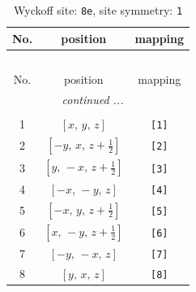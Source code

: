\documentclass[fleqn,8pt]{jsarticle}
\begin{document}
\renewcommand{\arraystretch}{1.2}
\begin{longtable}{ccc}
\caption{Wyckoff site: {\tt 8e}, site symmetry: {\tt 1}}
 \\
 \hline \hline
No. & position & mapping \\ \hline \endfirsthead

\multicolumn{2}{l}{\tablename\ \thetable{}} \\
 \hline \hline
No. & position & mapping \\ \hline \endhead

 \hline \hline
\multicolumn{2}{r}{\footnotesize\it continued ...} \\ \endfoot

 \hline \hline
\multicolumn{2}{r}{} \\ \endlastfoot

1 & $\left[ x,\, y,\, z \right]$ & {\tt [1]} \\ \hline
2 & $\left[ - y,\, x,\, z + \frac{1}{2} \right]$ & {\tt [2]} \\ \hline
3 & $\left[ y,\, - x,\, z + \frac{1}{2} \right]$ & {\tt [3]} \\ \hline
4 & $\left[ - x,\, - y,\, z \right]$ & {\tt [4]} \\ \hline
5 & $\left[ - x,\, y,\, z + \frac{1}{2} \right]$ & {\tt [5]} \\ \hline
6 & $\left[ x,\, - y,\, z + \frac{1}{2} \right]$ & {\tt [6]} \\ \hline
7 & $\left[ - y,\, - x,\, z \right]$ & {\tt [7]} \\ \hline
8 & $\left[ y,\, x,\, z \right]$ & {\tt [8]} \\
\end{longtable}
\end{document}
